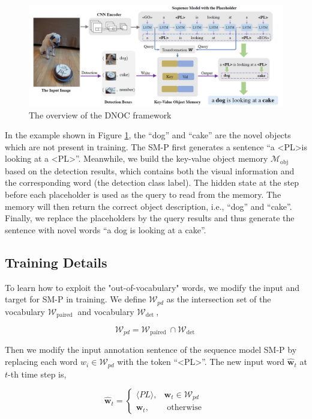 \documentclass[a4paper, 11pt]{article} %
\begin{document}
\begin{figure}[H]
	\centering
	\includegraphics[width=1.0\textwidth]{./img/overview.jpg}
	\caption{The overview of the DNOC framework}
	\label{fig:overview}
\end{figure}

In the example shown in Figure \ref{fig:overview}, the ``dog'' and ``cake'' are the novel
objects which are not present in training. The SM-P first generates a sentence ``a
\textless PL\textgreater is looking at a \textless PL\textgreater''. Meanwhile, we build
the key-value object memory $\mathcal{M}_{\mathrm{obj}}$ based on the detection results,
which contains both the visual information and the corresponding word (the detection class
label). The hidden state at the step before each placeholder is used as the query to read
from the memory. The memory will then return the correct object description, i.e., ``dog''
and ``cake''. Finally, we replace the placeholders by the query results and thus generate
the sentence with novel words ``a dog is looking at a cake''.

\subsection{\textbf{Training Details}}

To learn how to exploit the "out-of-vocabulary" words, we modify the input and target for
SM-P in training. We define $\mathcal{W}_{p d}$ as the intersection set of the vocabulary
$\mathcal{W}_{\text {paired }}$ and vocabulary $\mathcal{W}_{\text {det }}$,

$$
	\mathcal{W}_{p d}=\mathcal{W}_{\text {paired }} \cap \mathcal{W}_{\text {det }}
$$

Then we modify the input annotation sentence of the sequence model SM-P by replacing each
word $w_{i} \in \mathcal{W}_{p d}$ with the token ``\textless PL\textgreater''. The new
input word $\hat{\mathbf{w}}_{t}$ at $t$-th time step is,

$$
	\hat{\mathbf{w}}_{t}=\left\{\begin{array}{cl}
		\langle P L\rangle, & \mathbf{w}_{t} \in \mathcal{W}_{p d} \\
		\mathbf{w}_{t},     & \text { otherwise }
	\end{array}\right.
$$
\end{document}
